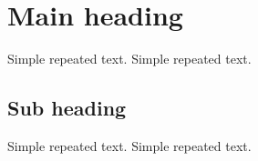 \documentclass{article}
\begin{document}
\tableofcontents

\section{Main heading}

Simple repeated text.
Simple repeated text.

\subsection{Sub heading}

Simple repeated text.
Simple repeated text.
\end{document}
